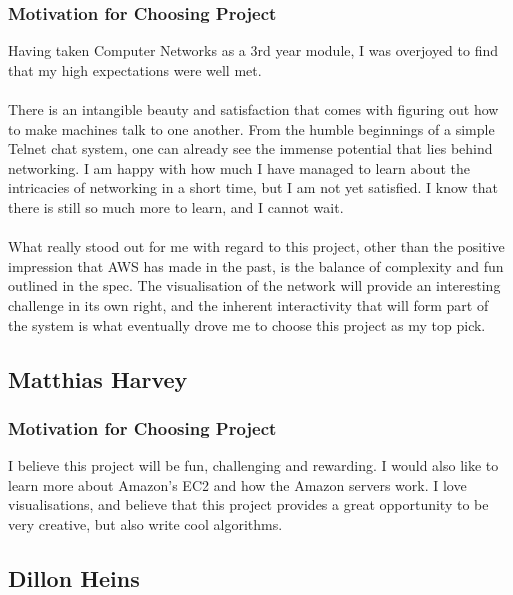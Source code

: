 \documentclass{article}
\begin{document}
	\subsubsection{Motivation for Choosing Project}
	Having taken Computer Networks as a 3rd year module, I was overjoyed to find that my high 	expectations were well met. 
\\\\
There is an intangible beauty and satisfaction that comes with figuring out how to make machines talk to one another. From the humble beginnings of a simple Telnet chat system, one can already see the immense potential that lies behind networking. I am happy with how much I have managed to learn about the intricacies of networking in a short time, but I am not yet satisfied. I know that there is still so much more to learn, and I cannot wait.
\\\\
	What really stood out for me with regard to this project, other than the positive impression that AWS has made in the past, is the balance of complexity and fun outlined in the spec. The visualisation of the network will provide an interesting challenge in its own right, and the inherent interactivity that will form part of the system is what eventually drove me to choose this project as my top pick.  

	\cleardoublepage

	\subsection{Matthias Harvey}
	
	\subsubsection{Motivation for Choosing Project}
	I believe this project will be fun, challenging and rewarding. I would also like to learn more about Amazon's EC2 and how the Amazon servers work. I love visualisations, and believe that this project provides a great opportunity to be very creative, but also write cool algorithms. 
	
	\cleardoublepage
	
	\subsection{Dillon Heins}
		
\end{document}
